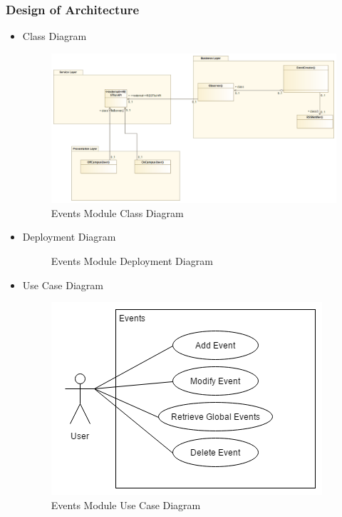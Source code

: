 \documentclass{article}
\begin{document}
			\newpage
			\subsubsection{Design of Architecture}
				\begin{itemize}
					\item Class Diagram
					\begin{center}
						\begin{figure}[!h]
							\includegraphics[scale=0.3]{Events_Class_Diagram.png}
							\caption{Events Module Class Diagram}
						\end{figure}
					\end{center}
					
					\item Deployment Diagram				
					\begin{center}
						\begin{figure}[!h]
							\caption{Events Module Deployment Diagram}
						\end{figure}
					\end{center}
					
					\item Use Case Diagram
					\begin{center}
						\begin{figure}[!h]
							\includegraphics[scale=0.6]{Events_Use_Case_Diagram.png}
							\caption{Events Module Use Case Diagram}
						\end{figure}
					\end{center}
					

\end{itemize}
\end{document}
